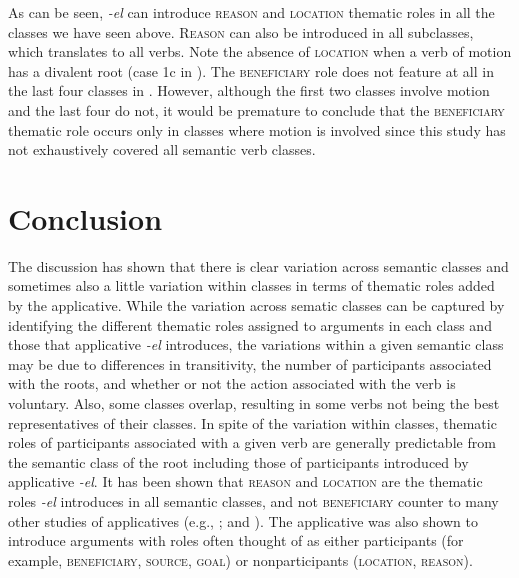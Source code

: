 \documentclass[output=paper]{langsci/langscibook}
\begin{document}
As can be seen, \textit{-el} can introduce \textsc{reason} and \textsc{location} thematic roles in all the classes we have seen above. \textsc{Reason} can also be introduced in all subclasses, which translates to all verbs. Note the absence of \textsc{location} when a verb of motion has a divalent root (case 1c in ). The \textsc{beneficiary} role does not feature at all in the last four classes in . However, although the first two classes involve motion and the last four do not, it would be premature to conclude that the \textsc{beneficiary} thematic role occurs only in classes where motion is involved since this study has not exhaustively covered all semantic verb classes.

\section{Conclusion}\label{sec:sibanda:5}

The discussion has shown that there is clear variation across semantic classes and sometimes also a little variation within classes in terms of thematic roles added by the applicative. While the variation across sematic classes can be captured by identifying the different thematic roles assigned to arguments in each class and those that applicative \textit{-el} introduces, the variations within a given semantic class may be due to differences in transitivity, the number of participants associated with the roots, and whether or not the action associated with the verb is voluntary. Also, some classes overlap, resulting in some verbs not being the best representatives of their classes. In spite of the variation within classes, thematic roles of participants associated with a given  verb are generally predictable from the semantic class of the root including those of participants introduced by applicative \textit{-el}. It has been shown that \textsc{reason} and \textsc{location} are the thematic roles \textit{-el} introduces in all semantic classes, and not \textsc{beneficiary} counter to many other studies of applicatives (e.g., \citealt{Schadeberg2003,Peterson2007,Polinsky2008,KittilaZuniga2010,deKindBostoen2012}; and \citealt{MartenKula2014}). The  applicative was also shown to introduce arguments with roles often thought of as either participants (for example, \textsc{beneficiary}, \textsc{source}, \textsc{goal}) or nonparticipants (\textsc{location}, \textsc{reason}). 
\end{document}
